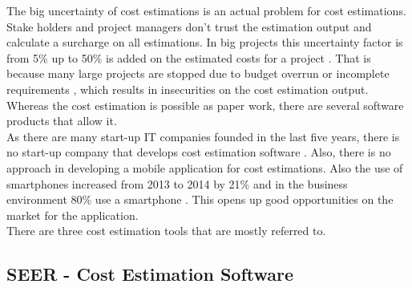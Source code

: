 The big uncertainty of cost estimations is an actual problem for cost estimations. Stake holders and project managers don't trust the estimation output and calculate a surcharge on all estimations. In big projects this uncertainty factor is from 5\% up to 50\% is added on the estimated costs for a project \cite{fischer}. That is because many large projects are stopped due to budget overrun or incomplete requirements \cite{chaos}, which results in insecurities on the cost estimation output.\\  
Whereas the cost estimation is possible as paper work, there are several software products that allow it.\\
As there are many start-up IT companies founded in the last five years, there is no start-up company that develops cost estimation software \cite{dsm}. Also, there is no approach in developing a mobile application for cost estimations. Also the use of smartphones increased from 2013 to 2014 by 21\% and in the business environment 80\% use a smartphone \cite{faszinationmobile}. This opens up good opportunities on the market for the application.\\
There are three cost estimation tools that are mostly referred to.\\

\subsection{SEER - Cost Estimation Software}


